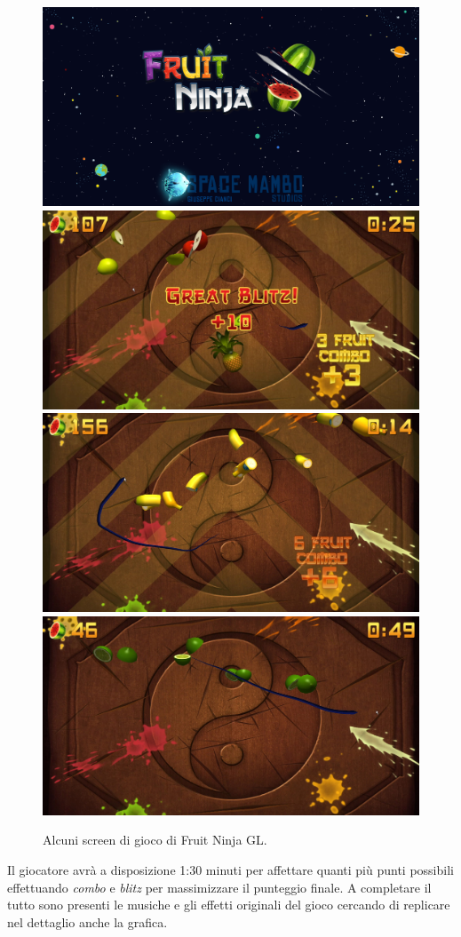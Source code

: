 \begin{figure}[!htp]
	\centering
	\includegraphics[width=0.49\linewidth]{images/ch10/a2} \hfill
	\includegraphics[width=0.49\linewidth]{images/ch10/a1}
	\\[0.15cm]
	\includegraphics[width=0.49\linewidth]{images/ch10/a3} \hfill
	\includegraphics[width=0.49\linewidth]{images/ch10/a4}	
	
	\caption{Alcuni screen di gioco di Fruit Ninja GL.}
\end{figure}

Il giocatore avrà a disposizione 1:30 minuti per affettare quanti più punti possibili effettuando \textit{combo} e \textit{blitz} per massimizzare il punteggio finale. A completare il tutto sono presenti le musiche e gli effetti originali del gioco cercando di replicare nel dettaglio anche la grafica.

